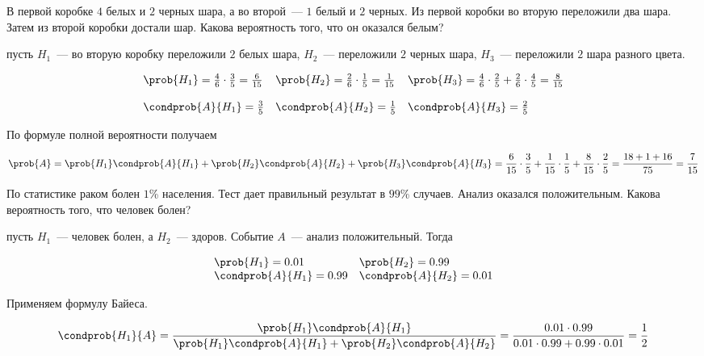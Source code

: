\begin{example}
  В первой коробке \(4\) белых и \(2\) черных шара, а во второй~--- \(1\) белый
  и \(2\) черных. Из первой коробки во вторую переложили два шара. Затем из
  второй коробки достали шар. Какова вероятность того, что он оказался белым?

  \solution{} пусть \(H_1\)~--- во вторую коробку переложили \(2\) белых шара,
  \(H_2\)~--- переложили \(2\) черных шара, \(H_3\)~--- переложили \(2\) шара
  разного цвета.

  \begin{equation*}
    \begin{array}{lll}
      \prob{H_1} = \frac{4}{6} \cdot \frac{3}{5}= \frac{6}{15}
      &
      \prob{H_2} = \frac{2}{6} \cdot \frac{1}{5} = \frac{1}{15}
      &
      \prob{H_3}
        = \frac{4}{6} \cdot \frac{2}{5} + \frac{2}{6} \cdot \frac{4}{5}
        = \frac{8}{15}
    \\ \\
      \condprob{A}{H_1} = \frac{3}{5}
      &
      \condprob{A}{H_2} = \frac{1}{5}
      &
      \condprob{A}{H_3} = \frac{2}{5}
    \end{array}
  \end{equation*}

  По формуле полной вероятности получаем

  \begin{equation*}
    \prob{A}
    = \prob{H_1} \condprob{A}{H_1}
      + \prob{H_2} \condprob{A}{H_2}
      + \prob{H_3} \condprob{A}{H_3}
    = \frac{6}{15} \cdot \frac{3}{5}
      + \frac{1}{15} \cdot \frac{1}{5}
      + \frac{8}{15} \cdot \frac{2}{5}
    = \frac{18 + 1 + 16}{75}
    = \frac{7}{15}
  \end{equation*}
\end{example}

\begin{example} \label{ex:Bayes}
  По статистике раком болен \(1\)\% населения. Тест дает правильный результат в 
  \(99\)\% случаев. Анализ оказался положительным. Какова вероятность того, что
  человек болен?

  \solution{} пусть \(H_1\)~--- человек болен, а \(H_2\)~--- здоров. Событие
  \(A\)~--- анализ положительный. Тогда

  \begin{equation*}
    \begin{array}{ll}
      \prob{H_1} = 0.01
      &
      \prob{H_2} = 0.99
    \\
      \condprob{A}{H_1} = 0.99
      &
      \condprob{A}{H_2} = 0.01
    \end{array}
  \end{equation*}

  Применяем формулу Байеса.

  \begin{equation*}
    \condprob{H_1}{A}
    = \frac{\prob{H_1} \condprob{A}{H_1}}
      {\prob{H_1} \condprob{A}{H_1} + \prob{H_2} \condprob{A}{H_2}}
    = \frac{0.01 \cdot 0.99}{0.01 \cdot 0.99 + 0.99 \cdot 0.01}
    = \frac{1}{2}
  \end{equation*}
\end{example}

